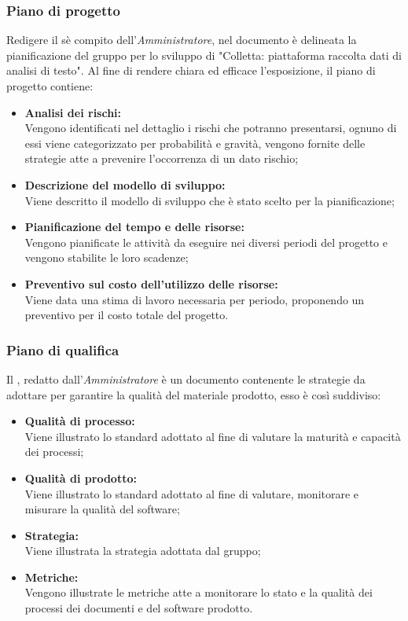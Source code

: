 \subsubsection{Piano di progetto}
Redigere il \PdP \space sè compito dell'\textit{Amministratore}, nel documento è delineata la pianificazione del gruppo \gruppo \space per lo sviluppo
di "Colletta: piattaforma raccolta dati di analisi di testo". \newline
Al fine di rendere chiara ed efficace l'esposizione, il piano di progetto contiene:
\begin{itemize}
	\item \textbf{Analisi dei rischi:}\\
Vengono identificati nel dettaglio i rischi che potranno presentarsi, ognuno di essi viene categorizzato per probabilità e gravità, vengono fornite delle strategie atte a prevenire l’occorrenza di un dato rischio;
\item \textbf{Descrizione del modello di sviluppo:}\\
Viene descritto il modello di sviluppo che è stato scelto per la pianificazione;
\item \textbf{Pianificazione del tempo e delle risorse:}\\
Vengono pianificate le attività da eseguire nei diversi periodi del progetto e vengono stabilite le loro scadenze;
\item \textbf{Preventivo sul costo dell'utilizzo delle risorse:}\\
Viene data una stima di lavoro necessaria per periodo,
proponendo un preventivo per il costo totale del progetto.
\end{itemize}

\subsubsection{Piano di qualifica}
Il \PdP, redatto dall'\textit{Amministratore} è un documento contenente le strategie
da adottare per garantire la qualità del materiale prodotto, esso è così suddiviso:\\

\begin{itemize}
	\item \textbf{Qualità di processo:}\\
	Viene illustrato lo standard adottato al fine di valutare la maturità e capacità dei processi;
	\item \textbf{Qualità di prodotto:}\\
	Viene illustrato lo standard adottato al fine di valutare, monitorare e misurare la qualità del software;
	\item \textbf{Strategia:}\\
	Viene illustrata la strategia adottata dal gruppo;
	\item \textbf{Metriche:}\\
	Vengono illustrate le metriche atte a monitorare lo stato e la qualità dei processi dei documenti e del software prodotto.
\end{itemize}

